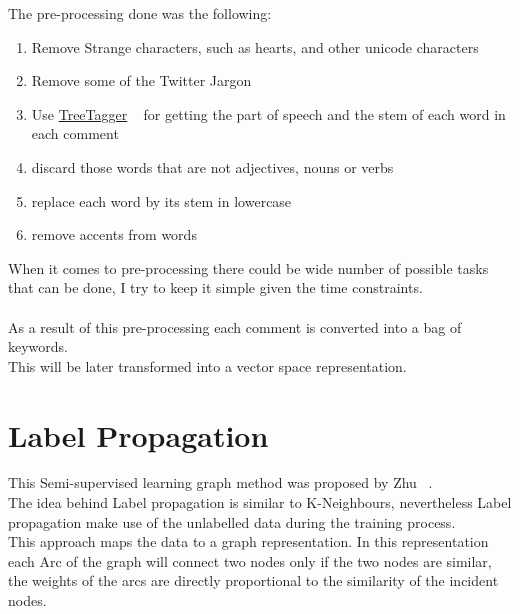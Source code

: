 \documentclass[4pt,a4paper,twocolumn]{article}
\begin{document}
The pre-processing done was the following:
\begin{enumerate}
	\item Remove Strange characters, such as hearts, and other unicode characters
	\item Remove some of the Twitter Jargon 
	\item Use \href{http://www.ims.uni-stuttgart.de/projekte/corplex/TreeTagger/}{TreeTagger} ~\cite{Schmid94probabilisticpart-of-speech} for getting the part of speech and the stem of each word in each comment
	\item discard those words that are not adjectives, nouns or verbs
	\item replace each word by its stem in lowercase
	\item remove accents from words
\end{enumerate}

When it comes to pre-processing there could be wide number of possible 
tasks that can be done, I try to keep it simple given the time constraints. \\
\\
As a result of this pre-processing each comment is converted into a bag of keywords.\\
This will be later transformed into a vector space representation.




\section{Label Propagation}

This Semi-supervised learning graph method was proposed by Zhu ~\cite{Zhu:2005:SLG:1104523}.\\
The idea behind Label propagation is similar to K-Neighbours, nevertheless Label propagation make use of the unlabelled data during the training process.\\

This approach maps the data to a graph representation.
In this representation each Arc of the graph will connect two nodes only if the two nodes are similar,
the weights of the arcs are directly proportional to the similarity of the incident nodes.\\
\end{document}
